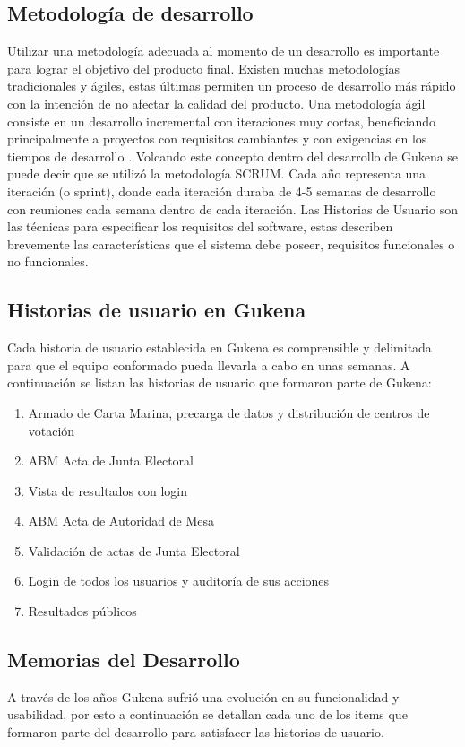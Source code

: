 \subsection{Metodología de desarrollo}
Utilizar una metodología adecuada al momento de un desarrollo es importante para lograr el objetivo del producto final. Existen muchas metodologías tradicionales y ágiles, estas últimas permiten un proceso de desarrollo más rápido con la intención de no afectar la calidad del producto. Una metodología ágil consiste en un desarrollo incremental con iteraciones muy cortas, beneficiando principalmente a proyectos con requisitos cambiantes y con exigencias en los tiempos
de desarrollo \cite{canos2012metodologias}. 
Volcando este concepto dentro del desarrollo de Gukena se puede decir que se utilizó la metodología SCRUM. Cada año representa una iteración (o sprint), donde cada iteración duraba de 4-5 semanas de desarrollo con reuniones cada semana dentro de cada iteración. Las Historias de Usuario son las técnicas para especificar los requisitos del software, estas describen brevemente las características que el sistema debe poseer, requisitos funcionales o no funcionales.
\subsection{Historias de usuario en Gukena}
 Cada historia de usuario establecida en Gukena es comprensible y delimitada para que el equipo conformado pueda llevarla a cabo en unas semanas. A continuación se listan las historias de usuario que formaron parte de Gukena:
 \begin{enumerate}
     \item Armado de Carta Marina, precarga de datos y distribución de centros de votación
     \item ABM Acta de Junta Electoral
     \item Vista de resultados con login
     \item ABM Acta de Autoridad de Mesa
     \item Validación de actas de Junta Electoral
     \item Login de todos los usuarios y auditoría de sus acciones
     \item Resultados públicos
 \end{enumerate}
 
\subsection{Memorias del Desarrollo}
A través de los años Gukena sufrió una evolución en su funcionalidad y usabilidad, por esto a continuación se detallan cada uno de los items que formaron parte del desarrollo para satisfacer las historias de usuario.

